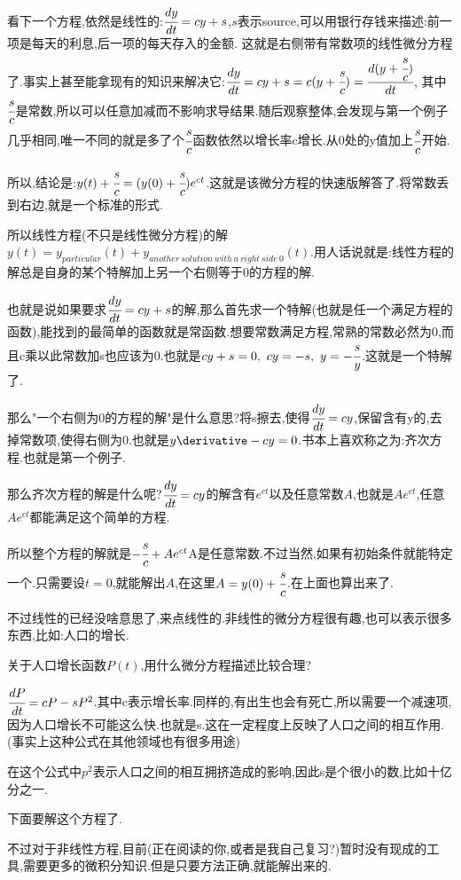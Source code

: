 {{{  看下一个方程,依然是线性的:$\cfrac{dy}{dt} = cy + s$,$s$表示source,可以用银行存钱来描述:前一项是每天的利息,后一项的每天存入的金额.
  这就是右侧带有常数项的线性微分方程了.事实上甚至能拿现有的知识来解决它:$\cfrac{dy}{dt} = cy + s = c(y + \cfrac{s}{c}) = \cfrac{d(y + \cfrac{s}{c})}{dt}$, 其中$\cfrac{s}{c}$是常数,所以可以任意加减而不影响求导结果.随后观察整体,会发现与第一个例子几乎相同,唯一不同的就是多了个$\cfrac{s}{c}$函数依然以增长率c增长.从0处的y值加上$\cfrac{s}{c}$开始.

  所以,结论是:$y(t) + \cfrac{s}{c} = (y(0) + \cfrac{s}{c})e^{ct}$.这就是该微分方程的快速版解答了.将常数丢到右边,就是一个标准的形式.

  所以线性方程(不只是线性微分方程)的解$y(t) = y_{particular}(t) + y_{another\ solution\ with\ a\ right\ side\ 0}(t)$.用人话说就是:线性方程的解总是自身的某个特解加上另一个右侧等于0的方程的解.

  也就是说如果要求$\cfrac{dy}{dt} = cy + s$的解,那么首先求一个特解(也就是任一个满足方程的函数),能找到的最简单的函数就是常函数.想要常数满足方程,常熟的常数必然为0,而且c乘以此常数加s也应该为0.也就是$cy + s = 0,\ cy = -s, \ y = -\cfrac{s}{y}$.这就是一个特解了.

  那么"一个右侧为0的方程的解"是什么意思?将s擦去,使得$\cfrac{dy}{dt} = cy$,保留含有y的,去掉常数项,使得右侧为0.也就是$y\derivative - cy = 0$.书本上喜欢称之为:齐次方程.也就是第一个例子.

  那么齐次方程的解是什么呢?$\cfrac{dy}{dt} = cy$的解含有$e^{ct}$以及任意常数$A$,也就是$Ae^{ct}$,任意$Ae^{ct}$都能满足这个简单的方程.

  所以整个方程的解就是$-\cfrac{s}{c} + Ae^{ct}$A是任意常数.不过当然,如果有初始条件就能特定一个.只需要设$t = 0$,就能解出$A$,在这里$A = y(0) + \cfrac{s}{c}$.在上面也算出来了.

  不过线性的已经没啥意思了,来点线性的.非线性的微分方程很有趣,也可以表示很多东西,比如:人口的增长.

  关于人口增长函数$P(t)$,用什么微分方程描述比较合理?

  $\cfrac{dP}{dt} = cP - sP^2$.其中c表示增长率.同样的,有出生也会有死亡,所以需要一个减速项,因为人口增长不可能这么快.也就是s.这在一定程度上反映了人口之间的相互作用.(事实上这种公式在其他领域也有很多用途)

  在这个公式中$p^2$表示人口之间的相互拥挤造成的影响,因此s是个很小的数,比如十亿分之一.

  下面要解这个方程了.

  不过对于非线性方程,目前(正在阅读的你,或者是我自己复习?)暂时没有现成的工具,需要更多的微积分知识.但是只要方法正确,就能解出来的.

}}}
